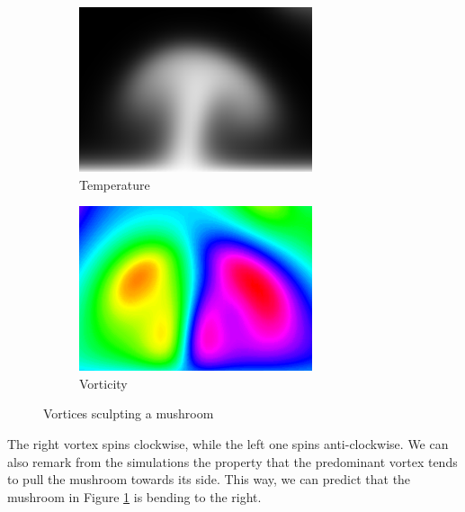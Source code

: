 \documentclass[12pt,oneside]{article}
\begin{document}
\begin{figure}[ht]
  \centering
  \begin{subfigure}[b]{0.48\textwidth}
    \includegraphics[width=\textwidth]{vort1.png}
    \caption{Temperature}
  \end{subfigure}
  \begin{subfigure}[b]{0.48\textwidth}
    \includegraphics[width=\textwidth]{vort2.png}
    \caption{Vorticity}
  \end{subfigure}
  \caption{Vortices sculpting a mushroom}\label{fig:vort}
\end{figure}

The right vortex spins clockwise, while the left one spins anti-clockwise. We can also remark from the simulations the property that the predominant vortex tends to pull the mushroom towards its side. This way, we can predict that the mushroom in Figure \ref{fig:vort} is bending to the right.
\end{document}
